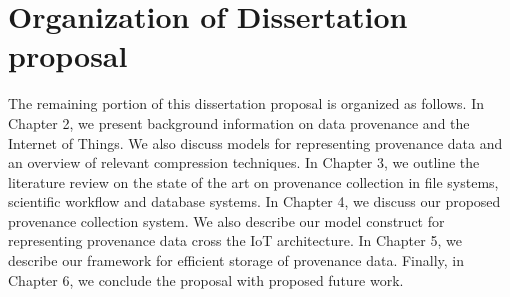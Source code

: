 \section{Organization of Dissertation proposal}

The remaining portion of this dissertation proposal is organized as follows. In Chapter 2, we present background information on data provenance and the Internet of Things. We also discuss models for representing provenance data and an overview of relevant compression techniques. In Chapter 3, we outline the literature review on the state of the art on provenance collection in file systems, scientific workflow and database systems. In Chapter 4, we discuss our proposed provenance collection system. We also describe our model construct for representing provenance data cross the IoT architecture. In Chapter 5, we describe our framework for efficient storage of provenance data. Finally, in Chapter 6, we conclude the proposal with proposed future work.

